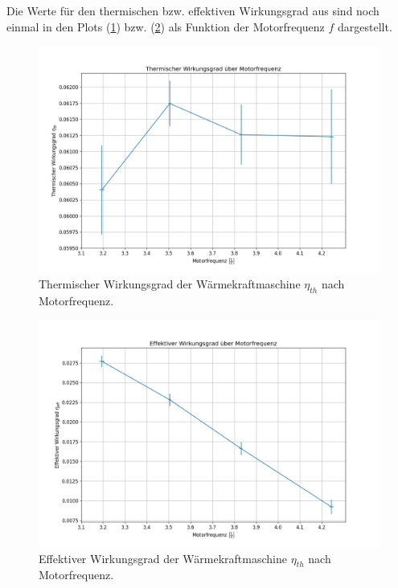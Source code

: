 Die Werte für den thermischen bzw. effektiven Wirkungsgrad aus  sind noch einmal in den Plots (\ref{fig:eta_th_freq}) bzw. (\ref{fig:eta_eff_freq}) als Funktion der Motorfrequenz $f$ dargestellt.

\begin{figure}[H]
    \centering
    \includegraphics[width=.9\textwidth]{files/eta_th_freq.png}
    \caption{Thermischer Wirkungsgrad der Wärmekraftmaschine $\eta_{th}$ nach Motorfrequenz.}
    \label{fig:eta_th_freq}
\end{figure}


\begin{figure}[H]
    \centering
    \includegraphics[width=.9\textwidth]{files/eta_eff_freq.png}
    \caption{Effektiver Wirkungsgrad der Wärmekraftmaschine $\eta_{th}$ nach Motorfrequenz.}
    \label{fig:eta_eff_freq}
\end{figure}